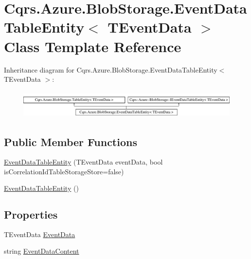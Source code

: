 \hypertarget{classCqrs_1_1Azure_1_1BlobStorage_1_1EventDataTableEntity}{}\section{Cqrs.\+Azure.\+Blob\+Storage.\+Event\+Data\+Table\+Entity$<$ T\+Event\+Data $>$ Class Template Reference}
\label{classCqrs_1_1Azure_1_1BlobStorage_1_1EventDataTableEntity}
Inheritance diagram for Cqrs.\+Azure.\+Blob\+Storage.\+Event\+Data\+Table\+Entity$<$ T\+Event\+Data $>$\+:\begin{figure}[H]
\begin{center}
\leavevmode
\includegraphics[height=1.477572cm]{classCqrs_1_1Azure_1_1BlobStorage_1_1EventDataTableEntity}
\end{center}
\end{figure}
\subsection*{Public Member Functions}
\begin{DoxyCompactItemize}
\item 
\hyperlink{classCqrs_1_1Azure_1_1BlobStorage_1_1EventDataTableEntity_a90c39733d651a5a71497909089e67c1a}{Event\+Data\+Table\+Entity} (T\+Event\+Data event\+Data, bool is\+Correlation\+Id\+Table\+Storage\+Store=false)
\item 
\hyperlink{classCqrs_1_1Azure_1_1BlobStorage_1_1EventDataTableEntity_a6785ad2dd88c6db1ec4a2d8d474b557d}{Event\+Data\+Table\+Entity} ()
\end{DoxyCompactItemize}
\subsection*{Properties}
\begin{DoxyCompactItemize}
\item 
T\+Event\+Data \hyperlink{classCqrs_1_1Azure_1_1BlobStorage_1_1EventDataTableEntity_a906bcb5198f91069413fc1d8e848866a}{Event\+Data}
\item 
string \hyperlink{classCqrs_1_1Azure_1_1BlobStorage_1_1EventDataTableEntity_a96b0a7c91d33d469e047c6bd5089d8de}{Event\+Data\+Content}
\end{DoxyCompactItemize}
